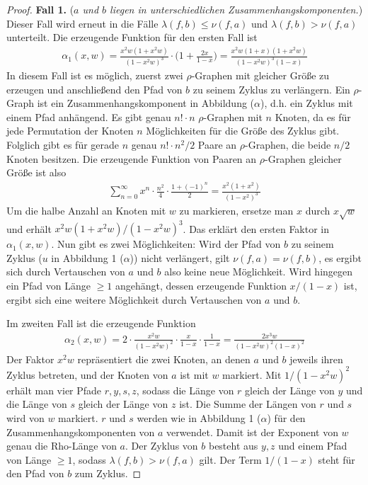 \documentclass[a4paper, 10pt, ngerman]{article}
\begin{document}
\begin{proof}
    \noindent \textbf{Fall 1.} (\emph{$a$ und $b$ liegen in unterschiedlichen Zusammenhangskomponenten.}) \space \space Dieser Fall wird erneut in die Fälle $\lambda(f, b) \le \nu(f, a)$ und $\lambda(f, b) > \nu(f, a)$ unterteilt. Die erzeugende Funktion für den ersten Fall ist
    \begin{align*}
        \alpha_1(x, w) = \frac {x^2w(1 + x^2w)} {(1 - x^2w)^3} \cdot \Bigg (1 + \frac {2x} {1 - x} \Bigg ) = \frac {x^2w(1 + x)(1 + x^2w)} {(1 - x^2w)^3(1 - x)}
    \end{align*}
    In diesem Fall ist es möglich, zuerst zwei $\rho$-Graphen mit gleicher Größe zu erzeugen und anschließend den Pfad von $b$ zu seinem Zyklus zu verlängern. Ein $\rho$-Graph ist ein Zusammenhangskomponent in Abbildung ($\alpha$), d.h. ein Zyklus mit einem Pfad anhängend. Es gibt genau $n! \cdot n$ $\rho$-Graphen mit $n$ Knoten, da es für jede Permutation der Knoten $n$ Möglichkeiten für die Größe des Zyklus gibt. Folglich gibt es für gerade $n$ genau $n! \cdot n^2/2$ Paare an $\rho$-Graphen, die beide $n/2$ Knoten besitzen. Die erzeugende Funktion von Paaren an $\rho$-Graphen gleicher Größe ist also
    \begin{align*}
        \sum_{n = 0}^\infty x^n \cdot \frac {n^2} 4 \cdot \frac {1 + (-1)^n} 2 = \frac {x^2(1 + x^2)} {(1 - x^2)^3}
    \end{align*}
    Um die halbe Anzahl an Knoten mit $w$ zu markieren, ersetze man $x$ durch $x \sqrt w$ und erhält $x^2w(1 + x^2w) / (1 - x^2w)^3$. Das erklärt den ersten Faktor in $\alpha_1(x, w)$. Nun gibt es zwei Möglichkeiten: Wird der Pfad von $b$ zu seinem Zyklus ($u$ in Abbildung 1 ($\alpha$)) nicht verlängert, gilt $\nu(f, a) = \nu(f, b)$, es ergibt sich durch Vertauschen von $a$ und $b$ also keine neue Möglichkeit. Wird hingegen ein Pfad von Länge $\ge 1$ angehängt, dessen erzeugende Funktion $x/(1 - x)$ ist, ergibt sich eine weitere Möglichkeit durch Vertauschen von $a$ und $b$.

    \noindent Im zweiten Fall ist die erzeugende Funktion
    \begin{align*}
        \alpha_2(x, w) = 2 \cdot \frac {x^2w} {(1 - x^2w)^2} \cdot  \frac x {1 - x} \cdot \frac {1}{1 - x} = \frac {2x^3w} {(1 - x^2w)^2 (1 - x)^2}
    \end{align*}
    Der Faktor $x^2w$ repräsentiert die zwei Knoten, an denen $a$ und $b$ jeweils ihren Zyklus betreten, und der Knoten von $a$ ist mit $w$ markiert. Mit $1 / (1 - x^2w)^2$ erhält man vier Pfade $r, y, s, z$, sodass die Länge von $r$ gleich der Länge von $y$ und die Länge von $s$ gleich der Länge von $z$ ist. Die Summe der Längen von $r$ und $s$ wird von $w$ markiert. $r$ und $s$ werden wie in Abbildung 1 ($\alpha$) für den Zusammenhangskomponenten von $a$ verwendet. Damit ist der Exponent von $w$ genau die Rho-Länge von $a$. Der Zyklus von $b$ besteht aus $y, z$ und einem Pfad von Länge $\ge 1$, sodass $\lambda(f, b) > \nu(f, a)$ gilt. Der Term $1 / (1 - x)$ steht für den Pfad von $b$ zum Zyklus.


\end{proof}
\end{document}
